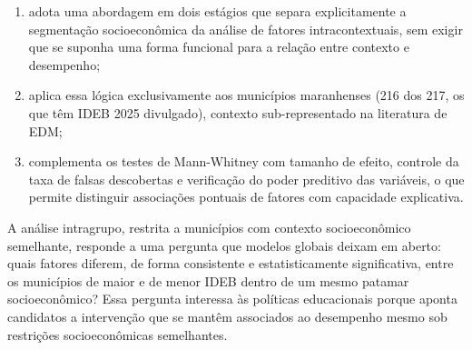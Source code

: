\begin{enumerate}[label=\alph*)]
    \item adota uma abordagem em dois estágios que separa explicitamente a segmentação socioeconômica da análise de fatores intracontextuais, sem exigir que se suponha uma forma funcional para a relação entre contexto e desempenho;
    \item aplica essa lógica exclusivamente aos municípios maranhenses (216 dos 217, os que têm IDEB 2025 divulgado), contexto sub-representado na literatura de EDM;
    \item complementa os testes de Mann-Whitney \citep{mannwhitney1947} com tamanho de efeito, controle da taxa de falsas descobertas e verificação do poder preditivo das variáveis, o que permite distinguir associações pontuais de fatores com capacidade explicativa.
\end{enumerate}

A análise intragrupo, restrita a municípios com contexto socioeconômico semelhante, responde a uma pergunta que modelos globais deixam em aberto: quais fatores diferem, de forma consistente e estatisticamente significativa, entre os municípios de maior e de menor IDEB dentro de um mesmo patamar socioeconômico? Essa pergunta interessa às políticas educacionais porque aponta candidatos a intervenção que se mantêm associados ao desempenho mesmo sob restrições socioeconômicas semelhantes.
